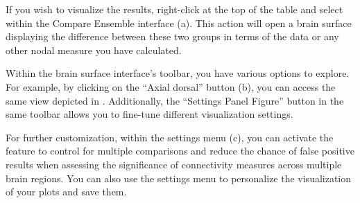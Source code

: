 \documentclass[justified]{tufte-handout}
\begin{document}
If you wish to visualize the results, right-click at the top of the table and select  within the Compare Ensemble interface (a). This action will open a brain surface displaying the difference between these two groups in terms of the  data or any other nodal measure you have calculated.

Within the brain surface interface's toolbar, you have various options to explore. For example, by clicking on the “Axial dorsal” button (b), you can access the same view depicted in . Additionally, the “Settings Panel Figure” button in the same toolbar allows you to fine-tune different visualization settings.

For further customization, within the settings menu (c), you can activate the  feature to control for multiple comparisons and reduce the chance of false positive results when assessing the significance of connectivity measures across multiple brain regions. You can also use the settings menu to personalize the visualization of your plots and save them.
\end{document}
